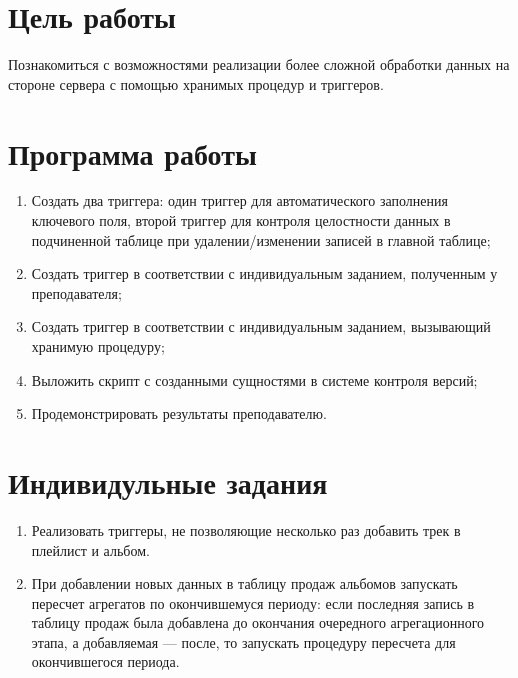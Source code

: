 \section{Цель работы}

Познакомиться с возможностями реализации более сложной обработки данных на стороне сервера с помощью хранимых процедур и триггеров.

\section{Программа работы}

\begin{enumerate}
	\item Создать два триггера: один триггер для автоматического заполнения ключевого поля, второй триггер для контроля целостности данных в подчиненной таблице при удалении/изменении записей в главной таблице;
	\item Создать триггер в соответствии с индивидуальным заданием, полученным у преподавателя;
	\item Создать триггер в соответствии с индивидуальным заданием, вызывающий хранимую процедуру;
	\item Выложить скрипт с созданными сущностями в системе контроля версий;
	\item Продемонстрировать результаты преподавателю.
\end{enumerate}

\section{Индивидульные задания}

\begin{enumerate}
	\item Реализовать триггеры, не позволяющие несколько раз добавить трек в плейлист и альбом.
	\item При добавлении новых данных в таблицу продаж альбомов запускать пересчет агрегатов по окончившемуся периоду: если последняя запись в таблицу продаж была добавлена до окончания очередного агрегационного этапа, а добавляемая --- после, то запускать процедуру пересчета для окончившегося периода.
\end{enumerate}